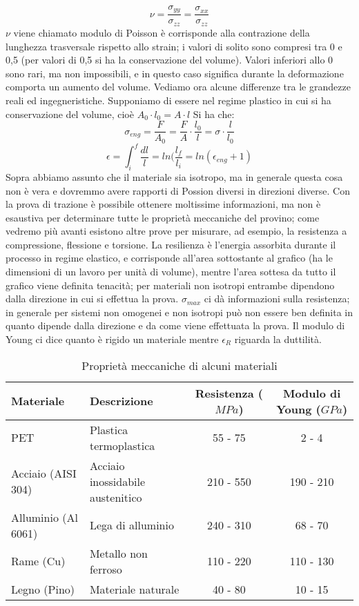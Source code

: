 \begin{equation}
    \nu=\frac{\sigma_{yy}}{\sigma_{zz}}=\frac{\sigma_{xx}}{\sigma_{zz}}
\end{equation}
$\nu$ viene chiamato modulo di Poisson è corrisponde alla contrazione della lunghezza trasversale rispetto allo strain; i valori di solito sono compresi tra 0 e 0,5 (per valori di 0,5 si ha la conservazione del volume). Valori inferiori allo 0 sono rari, ma non impossibili, e in questo caso significa durante la deformazione comporta un aumento del volume.
Vediamo ora alcune differenze tra le grandezze reali ed ingegneristiche.
Supponiamo di essere nel regime plastico in cui si ha conservazione del volume, cioè $A_0\cdot l_0=A\cdot l$
Si ha che:
$$\sigma_{eng}=\frac{F}{A_0}=\frac{F}{A}\cdot\frac{l_0}{l}=\sigma\cdot\frac{l}{l_0}$$
$$\epsilon=\int_i^f \frac{dl}{l}=ln(\frac{l_f}{l_i}=ln(\epsilon_{eng}+1)$$
Sopra abbiamo assunto che il materiale sia isotropo, ma in generale questa cosa non è vera e dovremmo avere rapporti di Possion diversi in direzioni diverse.
Con la prova di trazione è possibile ottenere moltissime informazioni, ma non è esaustiva per determinare tutte le proprietà meccaniche del provino; come vedremo più avanti esistono altre prove per misurare, ad esempio, la resistenza a compressione, flessione e torsione.
La resilienza è l'energia assorbita durante il processo in regime elastico, e corrisponde all'area sottostante al grafico (ha le dimensioni di un lavoro per unità di volume), mentre l'area sottesa da tutto il grafico viene definita tenacità; per materiali non isotropi entrambe dipendono dalla direzione in cui si effettua la prova.
$\sigma_{max}$ ci dà informazioni sulla resistenza; in generale per sistemi non omogenei e non isotropi può non essere ben definita in quanto dipende dalla direzione e da come viene effettuata la prova. Il modulo di Young ci dice quanto è rigido un materiale mentre $\epsilon_R$ riguarda la duttilità.
\begin{table}[h]
\centering
\begin{tabular}{@{}llcc@{}}
\toprule
\textbf{Materiale} & \textbf{Descrizione} & \textbf{Resistenza ($MPa$)} & \textbf{Modulo di Young ($GPa$)} \\ \midrule
PET  & Plastica termoplastica & 55 - 75 & 2 - 4 \\
Acciaio (AISI 304) & Acciaio inossidabile austenitico & 210 - 550 & 190 - 210 \\
Alluminio (Al 6061) & Lega di alluminio & 240 - 310 & 68 - 70 \\
Rame (Cu) & Metallo non ferroso & 110 - 220 & 110 - 130 \\
Legno (Pino) & Materiale naturale & 40 - 80 & 10 - 15 \\ \bottomrule
\end{tabular}
\caption{Proprietà meccaniche di alcuni materiali}
\label{tab:proprietà_materiali}
\end{table}



